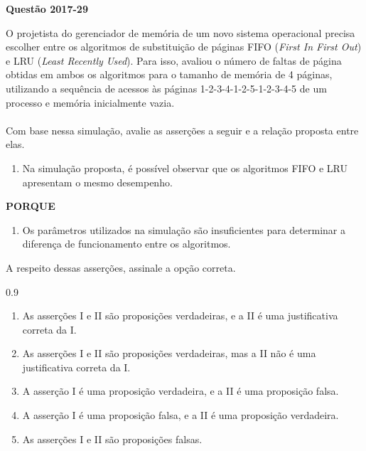 \documentclass[12pt,a4paper]{article}
\newenvironment{Question}[1]{%
    \pdfbookmark[3]{Questão #1}{q:#1}
    \label{q:#1}
    \par\bigskip\noindent
    \textbf{Questão #1} \dotfill
    \par\noindent
    \nopagebreak
    \ignorespaces
}{%
    \noindent\dotfill
}
\newenvironment{QuestionOptions}{%
    \begin{spacing}{0.9}%
    \small
    \begin{enumerate}[label=\Alph*)]
}{%
    \end{enumerate}
    \end{spacing}
}
\begin{document}
\begin{Question}{2017-29}
O projetista do gerenciador de memória de um novo sistema operacional precisa escolher
entre os algoritmos de substituição de páginas FIFO (\textit{First In First Out}) e LRU (\textit{Least Recently Used}).
Para isso, avaliou o número de faltas de página obtidas em ambos os algoritmos para o tamanho de memória de 4 páginas,
utilizando a sequência de acessos às páginas \mbox{1-2-3-4-1-2-5-1-2-3-4-5} de um processo e memória inicialmente vazia.\\\\
Com base nessa simulação, avalie as asserções a seguir e a relação proposta entre elas.
\begin{enumerate}[label=\Roman*.]
    \item Na simulação proposta, é possível observar que os algoritmos FIFO e LRU apresentam o mesmo desempenho.
\end{enumerate}
\begin{center}\textbf{PORQUE}\end{center}
\begin{enumerate}[label=\Roman*.,start=2]
    \item Os parâmetros utilizados na simulação são insuficientes para determinar a diferença de funcionamento entre os algoritmos.
\end{enumerate}
A respeito dessas asserções, assinale a opção correta.
\begin{QuestionOptions}
    \item As asserções I e II são proposições verdadeiras, e a II é uma justificativa correta da I.
    \item As asserções I e II são proposições verdadeiras, mas a II não é uma justificativa correta da I.
    \item A asserção I é uma proposição verdadeira, e a II é uma proposição falsa.
    \item A asserção I é uma proposição falsa, e a II é uma proposição verdadeira.
    \item As asserções I e II são proposições falsas.
\end{QuestionOptions}
\end{Question}
\end{document}
